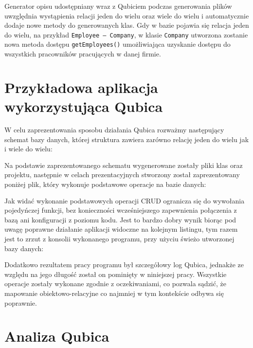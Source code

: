 \documentclass[12pt]{report}
\begin{document}
Generator opisu udostępniany wraz z Qubiciem podczas generowania plików \linebreak uwzględnia wystąpienia relacji jeden do wielu oraz wiele do wielu i automatycznie dodaje
nowe metody do generowanych klas.  Gdy w bazie pojawia się relacja jeden do wielu, na przykład {\tt Employee -- Company}, w klasie {\tt Company} utworzona zostanie nowa
metoda dostępu {\tt getEmployees()} umożliwiająca uzyskanie dostępu do wszystkich pracowników pracujących w danej firmie.

\section{Przykładowa aplikacja wykorzystująca Qubica}

W celu zaprezentowania sposobu działania Qubica rozważmy następujący schemat bazy danych, której struktura zawiera zarówno relację jeden do wielu jak i wiele do wielu:



Na podstawie zaprezentowanego schematu wygenerowane zostały pliki klas oraz projektu, następnie w celach prezentacyjnych stworzony został zaprezentowany poniżej
plik, który wykonuje podstawowe operacje na bazie danych:

\newpage



Jak widać wykonanie podstawowych operacji CRUD ogranicza się do wywołania pojedyńczej funkcji, bez konieczności wcześniejszego zapewnienia połączenia z bazą ani
konfiguracji z poziomu kodu. Jest to bardzo dobry wynik biorąc pod uwagę poprawne działanie aplikacji widoczne na kolejnym listingu, tym razem jest to zrzut z konsolii
wykonanego programu, przy użyciu świeżo utworzonej bazy danych:



Dodatkowo rezultatem pracy programu był szczegółowy log Qubica, jednakże ze względu na jego długość został on pominięty w niniejszej pracy. Wszystkie operacje zostały
wykonane zgodnie z oczekiwaniami, co pozwala sądzić, że mapowanie obiektowo-relacyjne co najmniej w tym kontekście odbywa się poprawnie.

\section{Analiza Qubica}
\end{document}
